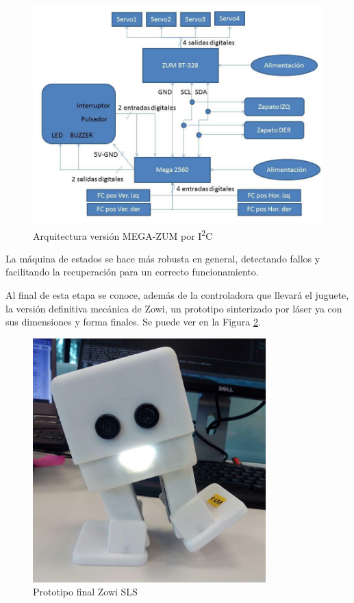 \begin{figure}
\centering
\includegraphics[width=130mm]{Figures/v3-diag}
\caption[Arquitectura versión MEGA-ZUM por I\textsuperscript{2}C]{Arquitectura versión MEGA-ZUM por I\textsuperscript{2}C}
\label{fig:v3-diag}
\end{figure}

La máquina de estados se hace más robusta en general, detectando fallos y facilitando la recuperación para un correcto funcionamiento.

Al final de esta etapa se conoce, además de la controladora que llevará el juguete, la versión definitiva mecánica de Zowi, un prototipo sinterizado por láser ya con sus dimensiones y forma finales. Se puede ver en la Figura \ref{fig:zowi-sls}. 

\begin{figure}
\centering
\includegraphics[width=90mm]{Figures/zowi-sls}
\caption[Prototipo final Zowi SLS]{Prototipo final Zowi SLS}
\label{fig:zowi-sls}
\end{figure}

